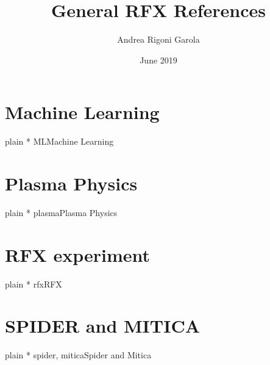 \documentclass[9pt]{elsarticle}
\title{General RFX References}
\author{Andrea Rigoni Garola}
\date{June 2019}
\begin{document}
\maketitle

\section{Machine Learning}
{plain}
\nocite{ML}{*}
{ML}{Machine Learning}

\section{Plasma Physics}
{plain}
\nocite{plasma}{*}
{plasma}{Plasma Physics}

\section{RFX experiment}
{plain}
\nocite{rfx}{*}
{rfx}{RFX}

\section{SPIDER and MITICA}
{plain}
\nocite{spider}{*}
{spider, mitica}{Spider and Mitica}
\end{document}
